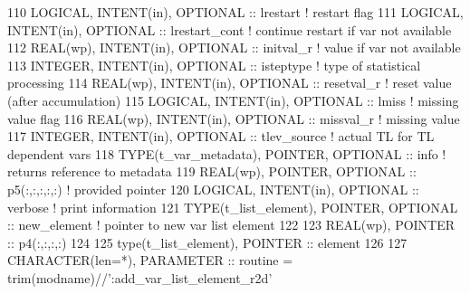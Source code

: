 \begin{DoxyCode}
110     \textcolor{keywordtype}{LOGICAL},              \textcolor{keywordtype}{INTENT(in)}, \textcolor{keywordtype}{OPTIONAL} :: lrestart            \textcolor{comment}{! restart flag}
111     \textcolor{keywordtype}{LOGICAL},              \textcolor{keywordtype}{INTENT(in)}, \textcolor{keywordtype}{OPTIONAL} :: lrestart\_cont       \textcolor{comment}{! continue restart if var not
       available}
112     \textcolor{keywordtype}{REAL(wp)},             \textcolor{keywordtype}{INTENT(in)}, \textcolor{keywordtype}{OPTIONAL} :: initval\_r           \textcolor{comment}{! value if var not available}
113     \textcolor{keywordtype}{INTEGER},              \textcolor{keywordtype}{INTENT(in)}, \textcolor{keywordtype}{OPTIONAL} :: isteptype           \textcolor{comment}{! type of statistical processing}
114     \textcolor{keywordtype}{REAL(wp)},             \textcolor{keywordtype}{INTENT(in)}, \textcolor{keywordtype}{OPTIONAL} :: resetval\_r          \textcolor{comment}{! reset value (after accumulation)}
115     \textcolor{keywordtype}{LOGICAL},              \textcolor{keywordtype}{INTENT(in)}, \textcolor{keywordtype}{OPTIONAL} :: lmiss               \textcolor{comment}{! missing value flag}
116     \textcolor{keywordtype}{REAL(wp)},             \textcolor{keywordtype}{INTENT(in)}, \textcolor{keywordtype}{OPTIONAL} :: missval\_r           \textcolor{comment}{! missing value}
117     \textcolor{keywordtype}{INTEGER},              \textcolor{keywordtype}{INTENT(in)}, \textcolor{keywordtype}{OPTIONAL} :: tlev\_source         \textcolor{comment}{! actual TL for TL dependent vars}
118     \textcolor{keywordtype}{TYPE}(t\_var\_metadata), \textcolor{keywordtype}{POINTER},    \textcolor{keywordtype}{OPTIONAL} :: info                \textcolor{comment}{! returns reference to metadata}
119     \textcolor{keywordtype}{REAL(wp)},             \textcolor{keywordtype}{POINTER},    \textcolor{keywordtype}{OPTIONAL} :: p5(:,:,:,:,:)       \textcolor{comment}{! provided pointer}
120     \textcolor{keywordtype}{LOGICAL},              \textcolor{keywordtype}{INTENT(in)}, \textcolor{keywordtype}{OPTIONAL} :: verbose             \textcolor{comment}{! print information}
121     \textcolor{keywordtype}{TYPE}(t\_list\_element), \textcolor{keywordtype}{POINTER}, \textcolor{keywordtype}{OPTIONAL}  :: new\_element           \textcolor{comment}{! pointer to new var list element}
122 
123     \textcolor{keywordtype}{REAL(wp)}, \textcolor{keywordtype}{POINTER} :: p4(:,:,:,:)
124 
125     type(t\_list\_element), \textcolor{keywordtype}{POINTER} :: element
126 
127     \textcolor{keywordtype}{CHARACTER(len=*)}, \textcolor{keywordtype}{PARAMETER} :: routine = trim(modname)//\textcolor{stringliteral}{':add\_var\_list\_element\_r2d'}

\end{DoxyCode}
